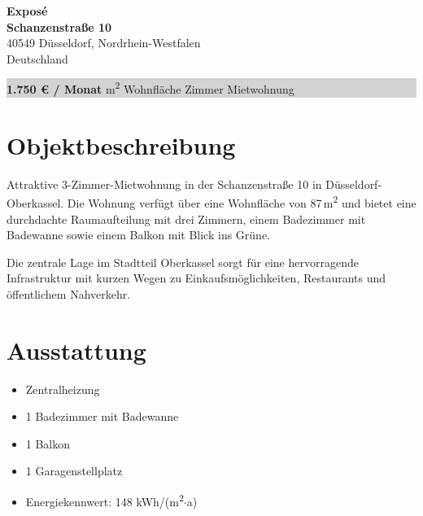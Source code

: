 \documentclass[11pt,a4paper]{article}
\begin{document}
\begin{center}
    {\Huge \textbf{\color{primary}Exposé}}\\[0.6cm]
    {\LARGE\bfseries Schanzenstraße 10}\\[0.3cm]
    {\large 40549 Düsseldorf, Nordrhein-Westfalen}\\[0.2cm]
    {\normalsize Deutschland}
\end{center}

\vspace{1cm}

\noindent
\colorbox{lightgray}{%
  \parbox{\dimexpr\textwidth-2\fboxsep}{%
    \centering\vspace{0.5em}
    {\Large\bfseries\color{primary} 1.750 \euro{} / Monat}
    \quad\textbar{} m\textsuperscript{2} Wohnfläche
    \quad\textbar{} Zimmer
    \quad\textbar\quad
    Mietwohnung
    \vspace{0.5em}
  }%
}

\vspace{1cm}

\section*{Objektbeschreibung}

Attraktive 3-Zimmer-Mietwohnung in der Schanzenstraße 10 in Düsseldorf-Oberkassel. Die Wohnung verfügt über eine Wohnfläche von 87\,m\textsuperscript{2} und bietet eine durchdachte Raumaufteilung mit drei Zimmern, einem Badezimmer mit Badewanne sowie einem Balkon mit Blick ins Grüne.

Die zentrale Lage im Stadtteil Oberkassel sorgt für eine hervorragende Infrastruktur mit kurzen Wegen zu Einkaufsmöglichkeiten, Restaurants und öffentlichem Nahverkehr.

\vspace{0.5cm}

\section*{Ausstattung}
\begin{itemize}
    \item Zentralheizung
    \item 1 Badezimmer mit Badewanne
    \item 1 Balkon
    \item 1 Garagenstellplatz
    \item Energiekennwert: 148 kWh/(m\textsuperscript{2}$\cdot$a)
\end{itemize}
\end{document}
